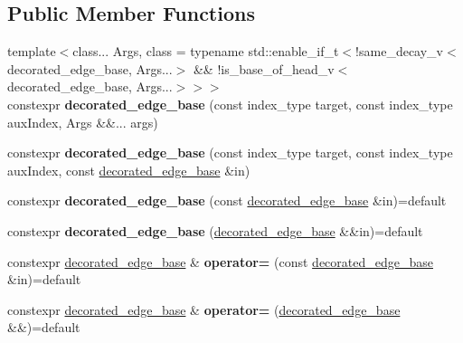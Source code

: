 \subsection*{Public Member Functions}
\begin{DoxyCompactItemize}
\item 
\mbox{\label{classsequoia_1_1maths_1_1decorated__edge__base_a45a60f870453f7fac465d6443e563a97}} 
{\footnotesize template$<$class... Args, class  = typename std\+::enable\+\_\+if\+\_\+t$<$!same\+\_\+decay\+\_\+v$<$decorated\+\_\+edge\+\_\+base, Args...$>$ \&\& !is\+\_\+base\+\_\+of\+\_\+head\+\_\+v$<$decorated\+\_\+edge\+\_\+base, Args...$>$$>$$>$ }\\constexpr {\bfseries decorated\+\_\+edge\+\_\+base} (const index\+\_\+type target, const index\+\_\+type aux\+Index, Args \&\&... args)
\item 
\mbox{\label{classsequoia_1_1maths_1_1decorated__edge__base_a94fe2f6a8851ff02159c389e3d6aa067}} 
constexpr {\bfseries decorated\+\_\+edge\+\_\+base} (const index\+\_\+type target, const index\+\_\+type aux\+Index, const \mbox{\hyperlink{classsequoia_1_1maths_1_1decorated__edge__base}{decorated\+\_\+edge\+\_\+base}} \&in)
\item 
\mbox{\label{classsequoia_1_1maths_1_1decorated__edge__base_a2c43c711894ff97b829092913a948dbd}} 
constexpr {\bfseries decorated\+\_\+edge\+\_\+base} (const \mbox{\hyperlink{classsequoia_1_1maths_1_1decorated__edge__base}{decorated\+\_\+edge\+\_\+base}} \&in)=default
\item 
\mbox{\label{classsequoia_1_1maths_1_1decorated__edge__base_ae51286d8cd82d085898d21927729749b}} 
constexpr {\bfseries decorated\+\_\+edge\+\_\+base} (\mbox{\hyperlink{classsequoia_1_1maths_1_1decorated__edge__base}{decorated\+\_\+edge\+\_\+base}} \&\&in)=default
\item 
\mbox{\label{classsequoia_1_1maths_1_1decorated__edge__base_a9a8a0306265a75530b365e6c0dccdaf9}} 
constexpr \mbox{\hyperlink{classsequoia_1_1maths_1_1decorated__edge__base}{decorated\+\_\+edge\+\_\+base}} \& {\bfseries operator=} (const \mbox{\hyperlink{classsequoia_1_1maths_1_1decorated__edge__base}{decorated\+\_\+edge\+\_\+base}} \&in)=default
\item 
\mbox{\label{classsequoia_1_1maths_1_1decorated__edge__base_aa7231d9df25e4b3b50a7f4a56b60ca87}} 
constexpr \mbox{\hyperlink{classsequoia_1_1maths_1_1decorated__edge__base}{decorated\+\_\+edge\+\_\+base}} \& {\bfseries operator=} (\mbox{\hyperlink{classsequoia_1_1maths_1_1decorated__edge__base}{decorated\+\_\+edge\+\_\+base}} \&\&)=default
\end{DoxyCompactItemize}
